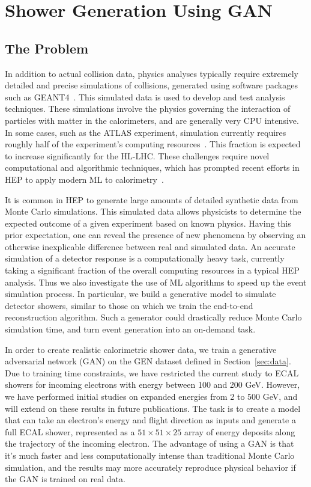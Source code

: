 \chapter{Shower Generation Using GAN}\label{sec:GAN}

\section{The Problem}

In addition to actual collision data, physics analyses typically require extremely detailed and precise simulations of collisions, generated using software packages such as GEANT4~\cite{GEANT4}. This simulated data is used to develop and test analysis techniques. These simulations involve the physics governing the interaction of particles with matter in the calorimeters, and are generally very CPU intensive. In some cases, such as the ATLAS experiment, simulation currently requires roughly half of the experiment's computing resources~\cite{GEANT_usage}. This fraction is expected to increase significantly for the HL-LHC. These challenges require novel computational and algorithmic techniques, which has prompted recent efforts in HEP to apply modern ML to calorimetry~\cite{ML1,ML2,ML3,ML4}.

It is common in HEP to generate large amounts of detailed synthetic data from Monte Carlo simulations. This simulated data allows physicists to determine the expected outcome of a given experiment based on known physics. Having this prior expectation, one can reveal the presence of new phenomena by observing an otherwise inexplicable difference between real and simulated data. An accurate simulation of a detector response is a computationally heavy task, currently taking a significant fraction of the overall computing resources in a typical HEP analysis. Thus we also investigate the use of ML algorithms to speed up the event simulation process. In particular, we build a generative model to simulate detector showers, similar to those on which we train the end-to-end reconstruction algorithm. Such a generator could drastically reduce Monte Carlo simulation time, and turn event generation into an on-demand task.

In order to create realistic calorimetric shower data, we train a generative adversarial network (GAN) on the GEN dataset defined in Section~\ref{sec:data}. Due to training time constraints, we have restricted the current study to ECAL showers for incoming electrons with energy between 100 and 200 GeV. However, we have performed initial studies on expanded energies from 2 to 500 GeV, and will extend on these results in future publications. The task is to create a model that can take an electron's energy and flight direction as inputs and generate a full ECAL shower, represented as a $51 \times 51 \times 25$ array of energy deposits along the trajectory of the incoming electron. 
The advantage of using a GAN is that it's much faster and less computationally intense than traditional Monte Carlo simulation, and the results may more accurately reproduce physical behavior if the GAN is trained on real data.

